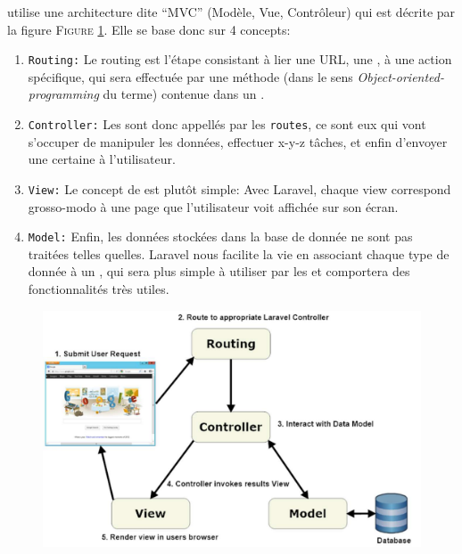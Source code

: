 \laravel{}{} utilise une architecture dite ``MVC'' (Modèle, Vue, Contrôleur) qui est décrite par la figure \textsc{Figure }\ref{fig:laravel_diagram}. Elle se base donc sur 4 concepts:
\begin{enumerate}
    \item \texttt{Routing:} Le routing est l'étape consistant à lier une URL, une \route{}, à une action spécifique, qui sera effectuée par une méthode (dans le sens \textit{Object-oriented-programming} du terme) contenue dans un \controller{}.
    \item \texttt{Controller:} Les \controllers{} sont donc appellés par les \texttt{routes}, ce sont eux qui vont s'occuper de manipuler les données, effectuer x-y-z tâches, et enfin d'envoyer une certaine \view{} à l'utilisateur.
    \item \texttt{View:} Le concept de \view{} est plutôt simple: Avec Laravel, chaque view correspond grosso-modo à une page que l'utilisateur voit affichée sur son écran.
    \item \texttt{Model:} Enfin, les données stockées dans la base de donnée ne sont pas traitées telles quelles. Laravel nous facilite la vie en associant chaque type de donnée à un \model{}, qui sera plus simple à utiliser par les \controllers{} et comportera des fonctionnalités très utiles.
\end{enumerate}

\begin{figure}[!h]
    \centering
    \includegraphics[width=\textwidth]{figures-C1/diagram.pdf}
    \caption{\label{fig:laravel_diagram}}
\end{figure}